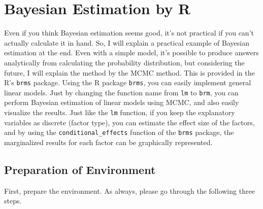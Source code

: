 \documentclass{ltjsarticle}
\begin{document}
\chapter{Bayesian Estimation by R}
\label{chapter27}
Even if you think Bayesian estimation seems good, it's not practical if you can't actually calculate it in hand. So, I will explain a practical example of Bayesian estimation at the end.
Even with a simple model, it's possible to produce answers analytically from calculating the probability distribution, but considering the future, I will explain the method by the MCMC method. This is provided in the R's \texttt{brms} package\parencite{brmsCite1,brmsCite2}.
Using the R package \texttt{brms}, you can easily implement general linear models. Just by changing the function name from \texttt{lm} to \texttt{brm}, you can perform Bayesian estimation of linear models using MCMC, and also easily visualize the results. Just like the \texttt{lm} function, if you keep the explanatory variables as discrete (factor type), you can estimate the effect size of the factors, and by using the \verb|conditional_effects| function of the \texttt{brms} package, the marginalized results for each factor can be graphically represented.
\section{Preparation of Environment}
First, prepare the environment. As always, please go through the following three steps.
\end{document}
